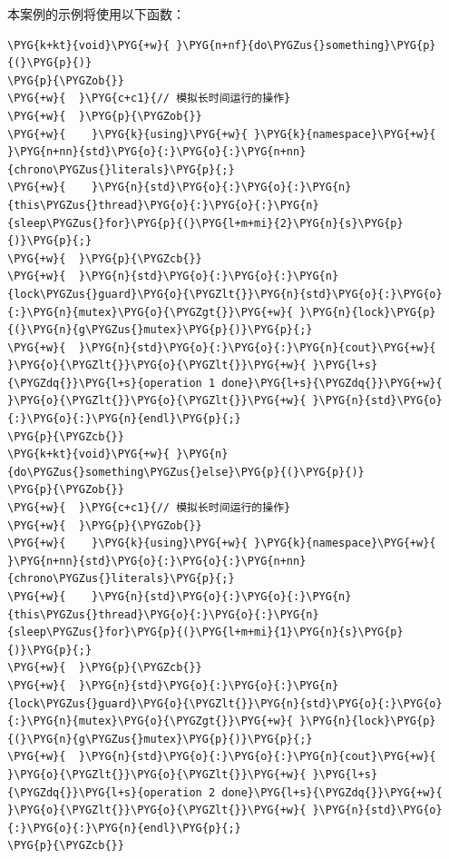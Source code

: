 
本案例的示例将使用以下函数：



\begin{codeblockbg}
\begin{Verbatim}[commandchars=\\\{\},breaklines=true,breakanywhere=true,fontsize=\codefont,xleftmargin=17bp]
\PYG{k+kt}{void}\PYG{+w}{ }\PYG{n+nf}{do\PYGZus{}something}\PYG{p}{(}\PYG{p}{)}
\PYG{p}{\PYGZob{}}
\PYG{+w}{  }\PYG{c+c1}{// 模拟长时间运行的操作}
\PYG{+w}{  }\PYG{p}{\PYGZob{}}
\PYG{+w}{    }\PYG{k}{using}\PYG{+w}{ }\PYG{k}{namespace}\PYG{+w}{ }\PYG{n+nn}{std}\PYG{o}{:}\PYG{o}{:}\PYG{n+nn}{chrono\PYGZus{}literals}\PYG{p}{;}
\PYG{+w}{    }\PYG{n}{std}\PYG{o}{:}\PYG{o}{:}\PYG{n}{this\PYGZus{}thread}\PYG{o}{:}\PYG{o}{:}\PYG{n}{sleep\PYGZus{}for}\PYG{p}{(}\PYG{l+m+mi}{2}\PYG{n}{s}\PYG{p}{)}\PYG{p}{;}
\PYG{+w}{  }\PYG{p}{\PYGZcb{}}
\PYG{+w}{  }\PYG{n}{std}\PYG{o}{:}\PYG{o}{:}\PYG{n}{lock\PYGZus{}guard}\PYG{o}{\PYGZlt{}}\PYG{n}{std}\PYG{o}{:}\PYG{o}{:}\PYG{n}{mutex}\PYG{o}{\PYGZgt{}}\PYG{+w}{ }\PYG{n}{lock}\PYG{p}{(}\PYG{n}{g\PYGZus{}mutex}\PYG{p}{)}\PYG{p}{;}
\PYG{+w}{  }\PYG{n}{std}\PYG{o}{:}\PYG{o}{:}\PYG{n}{cout}\PYG{+w}{ }\PYG{o}{\PYGZlt{}}\PYG{o}{\PYGZlt{}}\PYG{+w}{ }\PYG{l+s}{\PYGZdq{}}\PYG{l+s}{operation 1 done}\PYG{l+s}{\PYGZdq{}}\PYG{+w}{ }\PYG{o}{\PYGZlt{}}\PYG{o}{\PYGZlt{}}\PYG{+w}{ }\PYG{n}{std}\PYG{o}{:}\PYG{o}{:}\PYG{n}{endl}\PYG{p}{;}
\PYG{p}{\PYGZcb{}}
\PYG{k+kt}{void}\PYG{+w}{ }\PYG{n}{do\PYGZus{}something\PYGZus{}else}\PYG{p}{(}\PYG{p}{)}
\PYG{p}{\PYGZob{}}
\PYG{+w}{  }\PYG{c+c1}{// 模拟长时间运行的操作}
\PYG{+w}{  }\PYG{p}{\PYGZob{}}
\PYG{+w}{    }\PYG{k}{using}\PYG{+w}{ }\PYG{k}{namespace}\PYG{+w}{ }\PYG{n+nn}{std}\PYG{o}{:}\PYG{o}{:}\PYG{n+nn}{chrono\PYGZus{}literals}\PYG{p}{;}
\PYG{+w}{    }\PYG{n}{std}\PYG{o}{:}\PYG{o}{:}\PYG{n}{this\PYGZus{}thread}\PYG{o}{:}\PYG{o}{:}\PYG{n}{sleep\PYGZus{}for}\PYG{p}{(}\PYG{l+m+mi}{1}\PYG{n}{s}\PYG{p}{)}\PYG{p}{;}
\PYG{+w}{  }\PYG{p}{\PYGZcb{}}
\PYG{+w}{  }\PYG{n}{std}\PYG{o}{:}\PYG{o}{:}\PYG{n}{lock\PYGZus{}guard}\PYG{o}{\PYGZlt{}}\PYG{n}{std}\PYG{o}{:}\PYG{o}{:}\PYG{n}{mutex}\PYG{o}{\PYGZgt{}}\PYG{+w}{ }\PYG{n}{lock}\PYG{p}{(}\PYG{n}{g\PYGZus{}mutex}\PYG{p}{)}\PYG{p}{;}
\PYG{+w}{  }\PYG{n}{std}\PYG{o}{:}\PYG{o}{:}\PYG{n}{cout}\PYG{+w}{ }\PYG{o}{\PYGZlt{}}\PYG{o}{\PYGZlt{}}\PYG{+w}{ }\PYG{l+s}{\PYGZdq{}}\PYG{l+s}{operation 2 done}\PYG{l+s}{\PYGZdq{}}\PYG{+w}{ }\PYG{o}{\PYGZlt{}}\PYG{o}{\PYGZlt{}}\PYG{+w}{ }\PYG{n}{std}\PYG{o}{:}\PYG{o}{:}\PYG{n}{endl}\PYG{p}{;}
\PYG{p}{\PYGZcb{}}

\end{Verbatim}
\end{codeblockbg}
